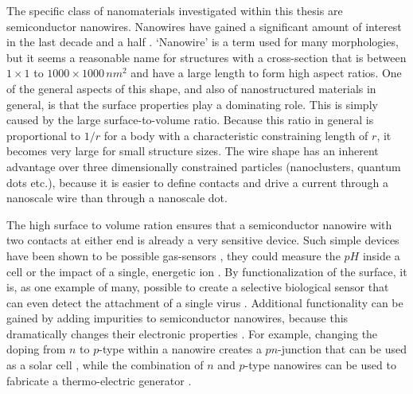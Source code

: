 The specific class of nanomaterials investigated within this thesis are semiconductor nanowires. Nanowires have gained a significant amount of  interest in the last decade and a half \cite{huang_room-temperature_2001,cui_nanowire_2001,duan_indium_2001,xia_one-dimensional_2003,lieber_functional_2007}. `Nanowire' is a term used for many morphologies, but it seems a reasonable name for structures with a cross-section that is between $1 \times 1$ to $1000 \times 1000\,nm^2$ and have a large length to form high aspect ratios. One of the general aspects of this shape, and also of nanostructured materials in general, is that the surface properties play a dominating role. This is simply caused by the large surface-to-volume ratio. Because this ratio in general is proportional to $1/r$ for a body with a characteristic constraining length of $r$, it becomes very large for small structure sizes. The wire shape has an inherent advantage over three dimensionally constrained particles (nanoclusters, quantum dots etc.), because it is easier to define contacts and drive a current through a nanoscale wire than through a nanoscale dot. 


The high surface to volume ration ensures that a semiconductor nanowire with two contacts at either end is already a very sensitive device. Such simple devices have been shown to be possible gas-sensors \cite{shen_devices_2009}, they could measure the $pH$ inside a cell \cite{cui_nanowire_2001} or the impact of a single, energetic ion \cite{johannes_persistent_2011}. By functionalization of the surface, it is, as one example of many, possible to create a selective biological sensor that can even detect the attachment of a single virus \cite{patolsky_electrical_2004}. Additional functionality can be gained by adding impurities to semiconductor nanowires, because this dramatically changes their electronic properties \cite{sze_physics_2006}. For example, changing the doping from $n$ to $p$-type within a nanowire creates a $pn$-junction that can be used as a solar cell \cite{kempa_single_2008,christesen_design_2012}, while the combination of $n$ and $p$-type nanowires can be used to fabricate a thermo-electric generator \cite{schierning_silicon_2014}.

